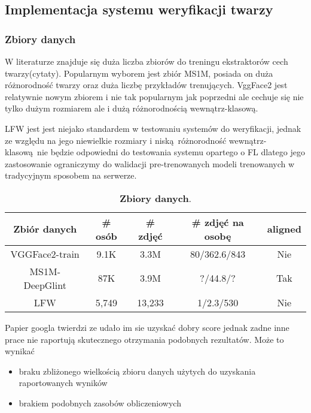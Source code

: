 

\subsection{Implementacja systemu weryfikacji twarzy}

\subsubsection{Zbiory danych}

W literaturze znajduje się duża liczba zbiorów do treningu ekstraktorów cech twarzy(cytaty).
Popularnym wyborem jest zbiór MS1M, posiada on duża różnorodność twarzy oraz duża liczbę
przykładów trenujących. VggFace2 jest relatywnie nowym zbiorem i nie tak popularnym jak poprzedni
ale cechuje się nie tylko dużym rozmiarem ale i dużą różnorodnością wewnątrz-klasową.

LFW jest jest niejako standardem w testowaniu systemów do weryfikacji, jednak ze względu na jego niewielkie rozmiary i niską różnorodność wewnątrz-klasową nie będzie odpowiedni do testowania systemu opartego o FL dlatego jego zastosowanie ograniczymy do walidacji pre-trenowanych  modeli trenowanych w tradycyjnym sposobem na serwerze.



\begin{table}[h]
\begin{center}
\begin{tabular}{c|c|c|c|c}
\hline
Zbiór danych  & \# osób   &   \# zdjęć  &   \# zdjęć na osobę   &   aligned \\
\hline
VGGFace2-train \cite{Cao18}     & 9.1K & 3.3M & 80/362.6/843 & Nie  \\ 
MS1M-DeepGlint \cite{glintweb}   & 87K  & 3.9M & ?/44.8/? & Tak \\
\hline
\hline
LFW \cite{LFWTechUpdate}   & 5,749  & 13,233 & 1/2.3/530 & Nie \\
\hline
\end{tabular}
\end{center}
\caption{\textbf{Zbiory danych}.}
\label{table:dataset}
\vspace{-4mm}
\end{table}


Papier googla twierdzi ze udało im sie uzyskać dobry score jednak zadne inne prace nie
raportują skutecznego otrzymania podobnych rezultatów. Może to wynikać
\begin{itemize}
    \item braku zbliżonego wielkością zbioru danych użytych do uzyskania raportowanych wyników
    \item brakiem podobnych zasobów obliczeniowych
\end{itemize}

